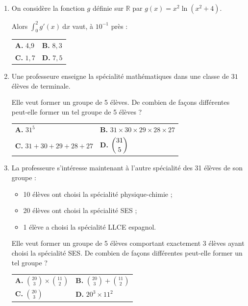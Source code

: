 \documentclass[10pt]{article}
\providecommand{\R}{\mathbb{R}}
\begin{document}
\begin{enumerate}
\item On considère la fonction $g$ définie sur $\R$ par $g(x) = x^2 \ln \left(x^2 + 4\right) $.

Alors $\displaystyle\int_0^2 g'(x)\:\text{d}x$ vaut, à $10^{-1}$ près :

\begin{center}
\begin{tabularx}{\linewidth}{X X}
\textbf{A. } 4,9&\textbf{B. } $8,3$\\
\textbf{C. } $1,7$&\textbf{D. } $7,5$
\end{tabularx}
\end{center}	
	\smallskip
	
\item Une professeure enseigne la spécialité mathématiques dans une classe de $31$ élèves de terminale.
	
Elle veut former un groupe de 5 élèves. De combien de façons différentes peut-elle former 
un tel groupe de 5 élèves ?

\begin{center}
\begin{tabularx}{\linewidth}{X X}
\textbf{A. } $31^5$&\textbf{B. } $31\times30\times29\times28\times27$\\
\textbf{C. } $31+30+29+28+27$&\textbf{D. } $\dbinom{31}{5}$
\end{tabularx}
\end{center}

	\item La professeure s'intéresse maintenant à l'autre spécialité des 31 élèves de son groupe :
	
\begin{itemize}
	\item 10 élèves ont choisi la spécialité physique-chimie ;
	\item 20 élèves ont choisi la spécialité SES ;
	\item 1 élève a choisi la spécialité LLCE espagnol.
\end{itemize}
	
Elle veut former un groupe de 5 élèves comportant exactement 3 élèves ayant choisi la
	spécialité SES. De combien de façons différentes peut-elle former un tel groupe ?
	
\begin{center}
\renewcommand\arraystretch{1.9}
\begin{tabularx}{\linewidth}{X X}
\textbf{A. } $\displaystyle\binom{20}{3} \times \binom{11}{2}$&\textbf{B. } $\displaystyle\binom{20}{3} + \binom{11}{2}$\\
\textbf{C. } $\displaystyle\binom{20}{3}$&\textbf{D. } $20^3 \times 11^2$
\end{tabularx}
\end{center}
\end{enumerate}

\bigskip
\end{document}
